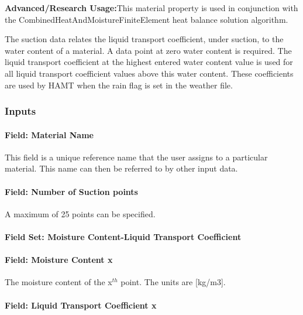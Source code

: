 \textbf{Advanced/Research Usage:}This material property is used in conjunction with the CombinedHeatAndMoistureFiniteElement heat balance solution algorithm.

The suction data relates the liquid transport coefficient, under suction, to the water content of a material. A data point at zero water content is required. The liquid transport coefficient at the highest entered water content value is used for all liquid transport coefficient values above this water content. These coefficients are used by HAMT when the rain flag is set in the weather file.

\subsubsection{Inputs}\label{inputs-9-022}

\paragraph{Field: Material Name}\label{field-material-name-2}

This field is a unique reference name that the user assigns to a particular material. This name can then be referred to by other input data.

\paragraph{Field: Number of Suction points}\label{field-number-of-suction-points}

A maximum of 25 points can be specified.

\paragraph{Field Set: Moisture Content-Liquid Transport Coefficient}\label{field-set-moisture-content-liquid-transport-coefficient}

\paragraph{Field: Moisture Content x}\label{field-moisture-content-x-1}

The moisture content of the x\(^{th}\) point. The units are {[}kg/m3{]}.

\paragraph{Field: Liquid Transport Coefficient x}\label{field-liquid-transport-coefficient-x}

